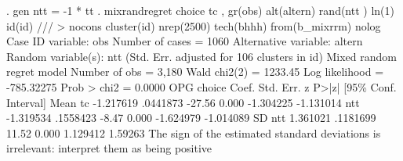 . gen ntt = -1 * tt
{\smallskip}
. mixrandregret choice  tc , gr(obs) alt(altern) rand(ntt ) ln(1) id(id) ///
> nocons cluster(id)  nrep(2500) tech(bhhh) from(b_mixrrm) nolog
{\smallskip}
Case ID variable: obs                          Number of cases    =       1060
Alternative variable: altern                   
Random variable(s): ntt                        
{\smallskip}
                                 (Std. Err. adjusted for  106 clusters in id)
{\smallskip}
Mixed random regret model                       Number of obs     =      3,180
                                                Wald chi2(2)      =    1233.45
Log likelihood = -785.32275                     Prob > chi2       =     0.0000
{\smallskip}
             {\VBAR}                 OPG
      choice {\VBAR}      Coef.   Std. Err.      z    P>|z|     [95\% Conf. Interval]
Mean         {\VBAR}
          tc {\VBAR}  -1.217619   .0441873   -27.56   0.000    -1.304225   -1.131014
         ntt {\VBAR}  -1.319534   .1558423    -8.47   0.000    -1.624979   -1.014089
SD           {\VBAR}
         ntt {\VBAR}   1.361021   .1181699    11.52   0.000     1.129412     1.59263
{\smallskip}
The sign of the estimated standard deviations is irrelevant: interpret them as
being positive
